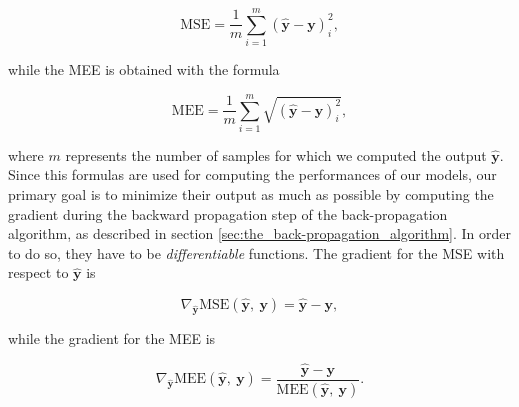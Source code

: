 		\begin{equation*}
		\label{mse}
		    \text{MSE} = \frac{1}{m}\sum_{i = 1}^{m}\left ( \hat{\mathbf{y}} - \mathbf{y} \right )^{2}_{i},
		\end{equation*}

		while the MEE is obtained with the formula

		\begin{equation*}
		\label{mee}
		    \text{MEE} = \frac{1}{m}\sum_{i = 1}^{m}\sqrt{\left (\hat{\mathbf{y}} - \mathbf{y} \right )^{2}_{i}},
		\end{equation*}

		where $m$ represents the number of samples for which we computed the output $\hat{\mathbf{y}}$. Since this
		formulas are used for computing the performances of our models, our primary goal is to minimize their
		output as much as possible by computing the gradient during the backward propagation step of the
		back-propagation algorithm, as described in section \ref{sec:the_back-propagation_algorithm}. In order to
		do so, they have to be \textit{differentiable} functions. The gradient for the MSE with respect to
		$\hat{\mathbf{y}}$ is

		\begin{equation*}
		     \nabla_{\hat{\mathbf{y}}}\text{MSE}\left(\hat{\mathbf{y}},\ \mathbf{y}\right) =
		     \hat{\mathbf{y}} - \mathbf{y},
		\end{equation*}

		while the gradient for the MEE is

		\begin{equation*}
		     \nabla_{\hat{\mathbf{y}}}\text{MEE}\left(\hat{\mathbf{y}},\ \mathbf{y}\right) =
		     \frac{\hat{\mathbf{y}} - \mathbf{y}}{\text{MEE}\left(\hat{\mathbf{y}},\ \mathbf{y}\right)}.
		\end{equation*}

